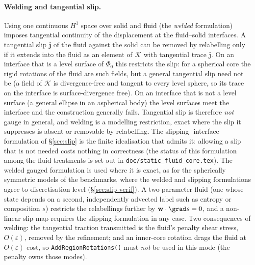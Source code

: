 \documentclass[11pt]{article}
\numberwithin{equation}{section}
\theoremstyle{remark}
\newcommand{\eps}{\varepsilon}
\newcommand{\vw}{\mathbf{w}}
\newcommand{\code}[1]{\texttt{#1}}
\begin{document}
\paragraph{Welding and tangential slip.} Using one continuous $H^1$ space
over solid and fluid (the \emph{welded} formulation) imposes tangential
continuity of the displacement at the fluid--solid interfaces. A
tangential slip $\mathbf{j}$ of the fluid against the solid can be removed
by relabelling only if it extends into the fluid as an element of
$\mathcal{K}$ with tangential trace $\mathbf{j}$. On an interface that is a
level surface of $\Phi_0$ this restricts the slip: for a spherical core
the rigid rotations of the fluid are such fields, but a general tangential
slip need not be (a field of $\mathcal{K}$ is divergence-free and tangent
to every level sphere, so its trace on the interface is surface-divergence
free). On an interface that is not a level surface (a general ellipse in
an aspherical body) the level surfaces meet the interface and the
construction generally fails. Tangential slip is therefore \emph{not}
gauge in general, and welding is a modelling restriction, exact where the
slip it suppresses is absent or removable by relabelling. The slipping-%
interface formulation of \S\ref{sec:slip} is the finite idealisation that admits it: allowing a
slip that is not needed costs nothing in correctness (the status of this
formulation among the fluid treatments is set out in
\code{doc/static\_fluid\_core.tex}). The welded gauged
formulation is used where it is exact, as for the spherically symmetric
models of the benchmarks, where the welded and slipping formulations agree
to discretisation level (\S\ref{sec:slip-verif}). A two-parameter fluid
(one whose state depends on a second, independently advected label such as
entropy or composition $s$) restricts the relabellings further by
$\vw\cdot\grad s = 0$, and a non-linear slip map requires the slipping
formulation in any case. Two consequences of welding: the tangential
traction transmitted is the fluid's penalty shear stress, $O(\eps)$,
removed by the refinement; and an inner-core rotation drags the fluid at
$O(\eps)$ cost, so \code{AddRegionRotations()} must \emph{not} be used in
this mode (the penalty owns those modes).
\end{document}
